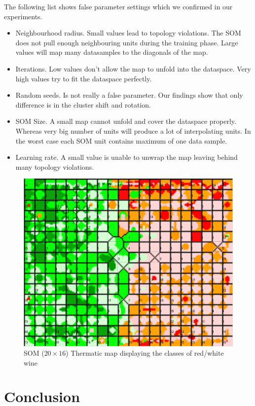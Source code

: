 \documentclass{acm_proc_article-sp}
\begin{document}
The following list shows false parameter settings which we confirmed in our experiments.

\begin{itemize}
    \item Neighbourhood radius. Small values lead to topology violations.
        The SOM does not pull enough neighbouring units during the training phase.
        Large values will map many datasamples to the diagonals of the map.
    \item Iterations. Low values don't allow the map to unfold into the dataspace.
        Very high values try to fit the dataspace perfectly.
    \item Random seeds. Is not really a false parameter. Our findings show that
        only difference is in the cluster shift and rotation.
    \item SOM Size. A small map cannot unfold and cover the dataspace properly. Whereas very
        big number of units will produce a lot of interpolating units. In the worst case each
        SOM unit contains maximum of one data sample.
    \item Learning rate. A small value is unable to unwrap the map leaving behind many topology violations.
\end{itemize}

\begin{figure}
\centering
    \centering
    \includegraphics[width=\linewidth]{img/wine-newmid-thermatic-class-map}
    \caption{SOM ($20\times16$) Thermatic map displaying the classes of red/white wine}
    \label{fig:wine-newmid-thermatic-class-map}
\end{figure}

\section{Conclusion}




\end{document}
